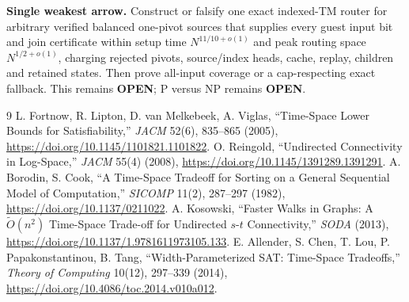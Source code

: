 \documentclass[11pt]{article}
\begin{document}
\textbf{Single weakest arrow.}  Construct or falsify one exact indexed-TM
router for arbitrary verified balanced one-pivot sources that supplies every
guest input bit and join certificate within setup time
$N^{11/10+o(1)}$ and peak routing space $N^{1/2+o(1)}$, charging rejected
pivots, source/index heads, cache, replay, children and retained states.  Then
prove all-input coverage or a cap-respecting exact fallback.  This remains
\textbf{OPEN}; P versus NP remains \textbf{OPEN}.

\begin{thebibliography}{9}
 L. Fortnow, R. Lipton, D. van Melkebeek, A. Viglas,
``Time-Space Lower Bounds for Satisfiability,'' \emph{JACM} 52(6), 835--865
(2005), \url{https://doi.org/10.1145/1101821.1101822}.
 O. Reingold, ``Undirected Connectivity in Log-Space,''
\emph{JACM} 55(4) (2008), \url{https://doi.org/10.1145/1391289.1391291}.
 A. Borodin, S. Cook, ``A Time-Space Tradeoff for
Sorting on a General Sequential Model of Computation,'' \emph{SICOMP} 11(2),
287--297 (1982), \url{https://doi.org/10.1137/0211022}.
 A. Kosowski, ``Faster Walks in Graphs: A
$\widetilde O(n^2)$ Time-Space Trade-off for Undirected $s$-$t$ Connectivity,''
\emph{SODA} (2013), \url{https://doi.org/10.1137/1.9781611973105.133}.
 E. Allender, S. Chen, T. Lou, P. Papakonstantinou,
B. Tang, ``Width-Parameterized SAT: Time-Space Tradeoffs,''
\emph{Theory of Computing} 10(12), 297--339 (2014),
\url{https://doi.org/10.4086/toc.2014.v010a012}.
\end{thebibliography}
\end{document}
